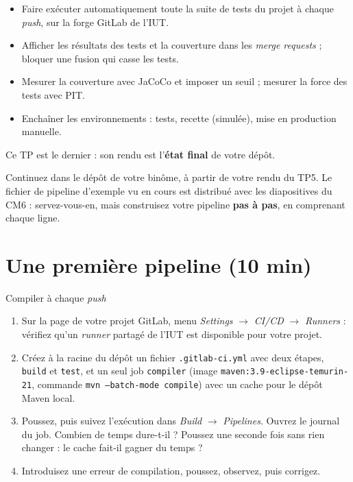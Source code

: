 \documentclass[11pt]{article}
\begin{document}

\begin{infobox}[Objectifs]
\begin{itemize}[leftmargin=1.2em, itemsep=1pt]
  \item Faire exécuter automatiquement toute la suite de tests du projet à chaque \textit{push}, sur la forge GitLab de l'IUT.
  \item Afficher les résultats des tests et la couverture dans les \textit{merge requests} ; bloquer une fusion qui casse les tests.
  \item Mesurer la couverture avec JaCoCo et imposer un seuil ; mesurer la force des tests avec PIT.
  \item Enchaîner les environnements : tests, recette (simulée), mise en production manuelle.
\end{itemize}
\end{infobox}

\begin{infobox}[Dernier TP]
Ce TP est le dernier : son rendu est l'\textbf{état final} de votre dépôt.
\end{infobox}

Continuez dans le dépôt de votre binôme, à partir de votre rendu du TP5. Le fichier de pipeline d'exemple vu en cours est distribué avec les diapositives du CM6 : servez-vous-en, mais construisez votre pipeline \textbf{pas à pas}, en comprenant chaque ligne.

\section{Une première pipeline (10 min)}

\begin{exobox}{Compiler à chaque \textit{push}}
\begin{enumerate}[leftmargin=1.4em]
  \item Sur la page de votre projet GitLab, menu \textit{Settings} $\rightarrow$ \textit{CI/CD} $\rightarrow$ \textit{Runners} : vérifiez qu'un \textit{runner} partagé de l'IUT est disponible pour votre projet.
  \item Créez à la racine du dépôt un fichier \texttt{.gitlab-ci.yml} avec deux étapes, \texttt{build} et \texttt{test}, et un seul job \texttt{compiler} (image \texttt{maven:3.9-eclipse-temurin-21}, commande \texttt{mvn --batch-mode compile}) avec un cache pour le dépôt Maven local.
  \item Poussez, puis suivez l'exécution dans \textit{Build} $\rightarrow$ \textit{Pipelines}. Ouvrez le journal du job. Combien de temps dure-t-il ? Poussez une seconde fois sans rien changer : le cache fait-il gagner du temps ?
  \item Introduisez une erreur de compilation, poussez, observez, puis corrigez.
\end{enumerate}
\end{exobox}
\end{document}
